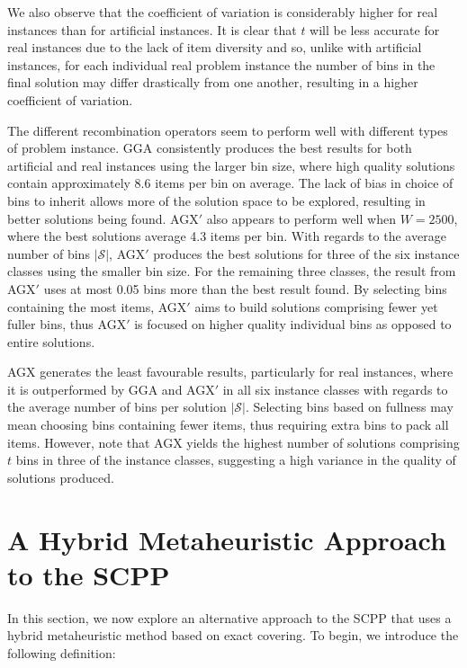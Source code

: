\documentclass{IEEEtran}
\begin{document}
We also observe that the coefficient of variation is considerably higher for real instances than for artificial instances. It is clear that $t$ will be less accurate for real instances due to the lack of item diversity and so, unlike with artificial instances, for each individual real problem instance the number of bins in the final solution may differ drastically from one another, resulting in a higher coefficient of variation.

The different recombination operators seem to perform well with different types of problem instance. GGA consistently produces the best results for both artificial and real instances using the larger bin size, where high quality solutions contain approximately 8.6 items per bin on average. The lack of bias in choice of bins to inherit allows more of the solution space to be explored, resulting in better solutions being found. AGX$'$ also appears to perform well when $W=2500$, where the best solutions average 4.3 items per bin. With regards to the average number of bins $|\mathcal{S}|$, AGX$'$ produces the best solutions for three of the six instance classes using the smaller bin size. For the remaining three classes, the result from AGX$'$ uses at most 0.05 bins more than the best result found. By selecting bins containing the most items, AGX$'$ aims to build solutions comprising fewer yet fuller bins, thus AGX$'$ is focused on higher quality individual bins as opposed to entire solutions.

AGX generates the least favourable results, particularly for real instances, where it is outperformed by GGA and AGX$'$ in all six instance classes with regards to the average number of bins per solution $|\mathcal{S}|$. Selecting bins based on fullness may mean choosing bins containing fewer items, thus requiring extra bins to pack all items. However, note that AGX yields the highest number of solutions comprising $t$ bins in three of the instance classes, suggesting a high variance in the quality of solutions produced.

\section{A Hybrid Metaheuristic Approach to the SCPP}
\label{sec:cmsa}
In this section, we now explore an alternative approach to the SCPP that uses a hybrid metaheuristic method based on exact covering. To begin, we introduce the following definition:
\end{document}
